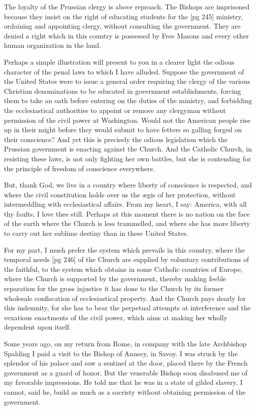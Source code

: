 The loyalty of the Prussian clergy is above reproach.
The Bishops are imprisoned because they
insist on the right of educating students for the
[pg 245]
ministry, ordaining and appointing clergy, without
consulting the government. They are denied
a right which in this country is possessed by Free
Masons and every other human organization in
the land.

Perhaps a simple illustration will present to
you in a clearer light the odious character of the
penal laws to which I have alluded. Suppose the
government of the United States were to issue a
general order requiring the clergy of the various
Christian denominations to be educated in government
establishments, forcing them to take an
oath before entering on the duties of the ministry,
and forbidding the ecclesiastical authorities to appoint
or remove any clergyman without permission
of the civil power at Washington. Would not
the American people rise up in their might before
they would submit to have fetters so galling
forged on their conscience? And yet this is precisely
the odious legislation which the Prussian
government is enacting against the Church. And
the Catholic Church, in resisting these laws, is
not only fighting her own battles, but she is contending
for the principle of freedom of conscience
everywhere.

But, thank God, we live in a country where liberty
of conscience is respected, and where the civil
constitution holds over us the ægis of her protection,
without intermeddling with ecclesiastical
affairs. From my heart, I say: America, with all
thy faults, I love thee still. Perhaps at this moment
there is no nation on the face of the earth
where the Church is less trammelled, and where
she has more liberty to carry out her sublime
destiny than in these United States.

For my part, I much prefer the system which
prevails in this country, where the temporal needs
[pg 246]
of the Church are supplied by voluntary contributions
of the faithful, to the system which obtains
in some Catholic countries of Europe, where
the Church is supported by the government, thereby
making feeble reparation for the gross injustice
it has done to the Church by its former wholesale
confiscation of ecclesiastical property. And
the Church pays dearly for this indemnity, for
she has to bear the perpetual attempts at interference
and the vexatious enactments of the civil
power, which aims at making her wholly dependent
upon itself.

Some years ago, on my return from Rome, in
company with the late Archbishop Spalding I
paid a visit to the Bishop of Annecy, in Savoy.
I was struck by the splendor of his palace and
saw a sentinel at the door, placed there by the
French government as a guard of honor. But
the venerable Bishop soon disabused me of my
favorable impressions. He told me that he was
in a state of gilded slavery. I cannot, said he,
build as much as a sacristy without obtaining
permission of the government.

